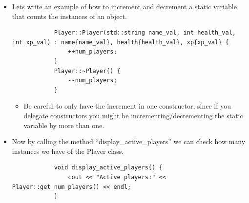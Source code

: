 \begin{itemize}
    \item Lets write an example of how to increment and decrement a static variable that counts the instances of an object.
        \begin{verbatim}
            Player::Player(std::string name_val, int health_val, int xp_val) : name{name_val}, health{health_val}, xp{xp_val} {
                ++num_players;
            }
            Player::~Player() {
                --num_players;
            }
        \end{verbatim}
        \begin{itemize}
            \item Be careful to only have the increment in one constructor, since if you delegate constructors you might be incrementing/decrementing the static variable by more than one.
        \end{itemize}
    
    \item Now by calling the method ``display\_active\_players'' we can check how many instances we have of the Player class.
        \begin{verbatim}
            void display_active_players() {
                cout << "Active players:" << Player::get_num_players() << endl;
            }
        \end{verbatim}
\end{itemize}

